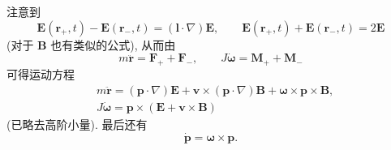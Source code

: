 \documentclass{article}
\begin{document}
注意到
\begin{equation}
	\mathbf E\!\left(\mathbf r_+,t\right)-\mathbf E\!\left(\mathbf r_-,t\right)=\left(\mathbf l\cdot\nabla\right)\mathbf E,
	\qquad\mathbf E\!\left(\mathbf r_+,t\right)+\mathbf E\!\left(\mathbf r_-,t\right)=2\mathbf E
\end{equation}
(对于 $\mathbf B$ 也有类似的公式),
从而由
\begin{equation}
	m\ddot{\mathbf r}=\mathbf F_++\mathbf F_-,
	\qquad J\dot{\boldsymbol\omega}=\mathbf M_++\mathbf M_-
\end{equation}
可得运动方程
\begin{align}
	&m\ddot{\mathbf r}=\left(\mathbf p\cdot\nabla\right)\mathbf E+\mathbf v\times\left(\mathbf p\cdot\nabla\right)\mathbf B+\boldsymbol\omega\times\mathbf p\times\mathbf B,\\
	&J\dot{\boldsymbol\omega}=\mathbf p\times\left(\mathbf E+\mathbf v\times\mathbf B\right)
\end{align}
(已略去高阶小量).
最后还有
\begin{equation}
	\dot{\mathbf p}=\boldsymbol\omega\times\mathbf p.
\end{equation}
\end{document}
